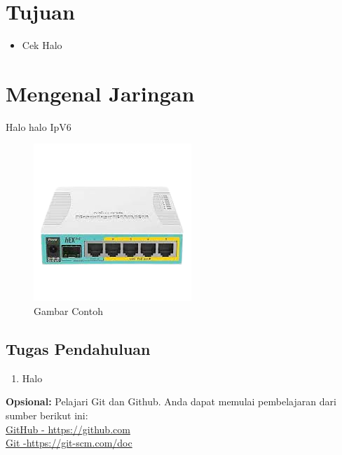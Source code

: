 \section{Tujuan}
\begin{itemize}[label=$\bullet$, itemsep=-1pt, leftmargin=*]
    \item Cek Halo
\end{itemize}

\section{Mengenal Jaringan}
Halo halo IpV6

\begin{figure}[H]
    \centering
    \includegraphics[width=0.7\linewidth]{P5/img/contoh.png}
    \caption{Gambar Contoh}
    \label{fig:gambarcontoh}
\end{figure}

\subsection{Tugas Pendahuluan}
\begin{enumerate}
    \item Halo
\end{enumerate}


\begin{center}
    \colorbox{cyan!30}{\parbox{0.8\linewidth}{\textbf{Opsional:} Pelajari Git dan Github. Anda dapat memulai pembelajaran dari sumber berikut ini: \\ \href{https://github.com}{GitHub - https://github.com} \\ \href{https://git-scm.com/doc}{Git -https://git-scm.com/doc}}}
\end{center}